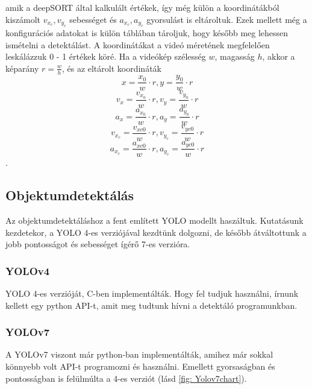 \documentclass[acmtog, authorversion]{acmart}
\begin{document}
amik a deepSORT által kalkulált értékek, így még külön a koordinátákból kiszámolt \begin{math}v_{x_c},v_{y_c}\end{math} sebességet és
\begin{math}a_{x_c},a_{y_c}\end{math} gyorsulást is eltároltuk.
Ezek mellett még a konfigurációs adatokat is külön táblában tároljuk, hogy később meg lehessen ismételni a detektálást. 
A koordinátákat a videó méretének megfelelően leskálázzuk 0 - 1 értékek köré. Ha a videókép szélesség \begin{math}w\end{math}, magasság \begin{math}h\end{math}, 
akkor a képarány \begin{math}r = \frac{w}{h}\end{math}, és az eltárolt koordináták 
\begin{equation}x = \frac{x_0}{w} \cdot r, y = \frac{y_0}{w} \cdot r\end{equation}
\begin{equation}v_x = \frac{v_{x_0}}{w} \cdot r, v_y = \frac{v_{y_0}}{w} \cdot r\end{equation}
\begin{equation}a_x = \frac{a_{x_0}}{w} \cdot r, a_y = \frac{a_{y_0}}{w} \cdot r\end{equation}
\begin{equation}v_{x_c} = \frac{v_{xc0}}{w} \cdot r, v_{y_c} = \frac{v_{yc0}}{w} \cdot r\end{equation}
\begin{equation}a_{x_c} = \frac{a_{xc0}}{w} \cdot r, a_{y_c} = \frac{a_{yc0}}{w} \cdot r\end{equation}.
\subsection{Objektumdetektálás}
Az objektumdetektáláshoz a fent említett YOLO modellt haszáltuk. Kutatásunk kezdetekor, a YOLO 4-es verziójával kezdtünk dolgozni,
de később átváltottunk a jobb pontosságot és sebességet ígérő 7-es verzióra.
\subsubsection{YOLOv4}
YOLO 4-es verzióját, C-ben implementálták. Hogy fel tudjuk használni, írnunk kellett egy python API-t, amit meg tudtunk hívni a
detektáló programunkban.
\subsubsection{YOLOv7}
A YOLOv7 viszont már python-ban implementálták, amihez már sokkal könnyebb volt API-t programozni és használni. Emellett gyorsaságban
és pontosságban is felülmúlta a 4-es verziót (lásd \ref{fig: Yolov7chart}).
\end{document}
